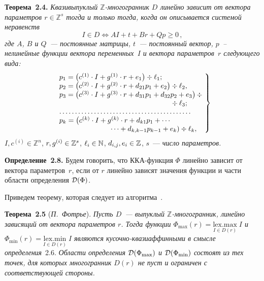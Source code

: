 \begin{multicols}{2}
\smallskip

\noindent
\textbf{Теорема~2.4.}
\textit{Квазивыпуклый $\mathbb{Z}$-многогранник $D$ линейно зависит от
вектора параметров $r\in\mathbb{Z}^s$ тогда и только тогда, когда он
описывается системой неравенств}
\begin{equation*}
I\in D  \Leftrightarrow  AI+t+Br+Qp \geq 0\,, 
\end{equation*}
\textit{где $A$, $B$ и $Q$~--- постоянные матрицы, $t$~--- постоянный вектор,
$p$~-- нелинейные функции вектора переменных~$I$ и вектора параметров~$r$ следующего вида:}
\begin{equation}
\!\left.
\begin{array}{l}
 p_1 = \left(c^{(1)}\cdot I + g^{(1)}\cdot r + e_1\right) \div \ell_1;\\
 p_2 = \left(c^{(2)}\cdot I + g^{(2)}\cdot r + d_{21}p_1 + e_2\right) \div \ell_2,\\
 p_3 = \left(c^{(3)}\cdot I + g^{(3)}\cdot r + d_{31}p_1 + d_{32}p_2 + e_3\right) \div\\
\hspace*{55mm} {}\div \ell_3;\\
 \ldots \ldots \ldots \ldots \ldots \ldots \ldots\ldots \ldots \ldots \ldots\ldots \ldots \ldots\\
 p_k = \left(c^{(k)}\cdot I + g^{(k)}\cdot r + d_{k1}p_1 + \cdots\right. \\
\hspace*{25mm}\left.\cdots + d_{k,k-1}p_{k-1} + e_k\right) \div \ell_k,
\end{array}\!
\right\}\!\!
\label{defpParam}
\end{equation}
$I,c^{(i)}\in\mathbb{Z}^n$, $r,g^{(i)}\hm\in\mathbb{Z}^s$, 
$\ell_i\hm\in\mathbb{N}$, $d_{i,j},e_i\hm\in\mathbb{Z}$, $s$~--- \textit{число параметров.}


\smallskip

\noindent
\textbf{Определение~2.8.}
Будем говорить, что ККА-функ\-ция $\Phi$ линейно зависит от вектора
па\-ра\-мет\-ров~$r$, если от $r$ линейно зависят значения функции и части
области определения ${\cal D}(\Phi)$.

\smallskip

Приведем теорему, которая следует из алгоритма~\cite{Feautrier2}.

\smallskip

\noindent
\textbf{Теорема~2.5}
(\textit{П.~Фотрье}). \textit{Пусть $D$~--- выпуклый $\mathbb{Z}$-многогранник,
линейно зависящий от вектора параметров $r$. Тогда функции
$\Phi_{\max}(r)=\underset{I\in D(r)}{\mathrm{lex.max}}\;I$  и
$\Phi_{\min}(r)=\underset{I\in D(r)}{\mathrm{lex.min}}\;I$ являются
кусочно-квазиаф\-фин\-ными в смысле определения}~2.6.
\textit{Области определения ${\cal D}(\Phi_{\max})$ и ${\cal
D}(\Phi_{\min})$ состоят из тех точек, для которых многогранник
$D(r)$ не пуст и ограничен с соответствующей стороны.}


\end{multicols}
